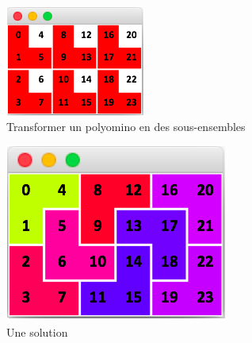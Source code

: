 \documentclass[a4paper,12pt]{article}
\begin{document}
\begin{figure}[t]
	\centering
	\begin{subfigure}[h]{0.35\textwidth}
		\includegraphics[width=\textwidth]{figures/transition5.png}
		\caption{\label{fig:p2s}Transformer un polyomino en des sous-ensembles}
	\end{subfigure}
	\hspace{0.2\textwidth}
	\begin{subfigure}[h]{0.35\textwidth}
		\includegraphics[width=\textwidth]{figures/solution5.png}
		\caption{\label{fig:solution}Une solution}
	\end{subfigure}
	\caption{}
\end{figure}
\end{document}
